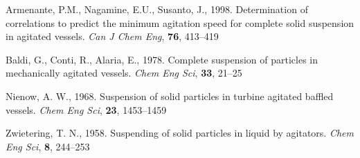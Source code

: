 \begin{thebibliography}{99}

 Armenante, P.M., Nagamine, E.U., Susanto, J., 1998. Determination of correlations to predict the minimum agitation speed for complete solid suspension in agitated vessels. \textit{Can J Chem Eng}, \textbf{76}, 413--419

 Baldi, G., Conti, R., Alaria, E., 1978. Complete suspension of particles in mechanically agitated vessels. \textit{Chem Eng Sci}, \textbf{33}, 21--25 

 Nienow, A. W., 1968. Suspension of solid particles in turbine agitated baffled vessels. \textit{Chem Eng Sci}, \textbf{23}, 1453--1459 

 Zwietering, T. N., 1958. Suspending of solid particles in liquid by agitators. \textit{Chem Eng Sci}, \textbf{8}, 244--253 

\end{thebibliography}
